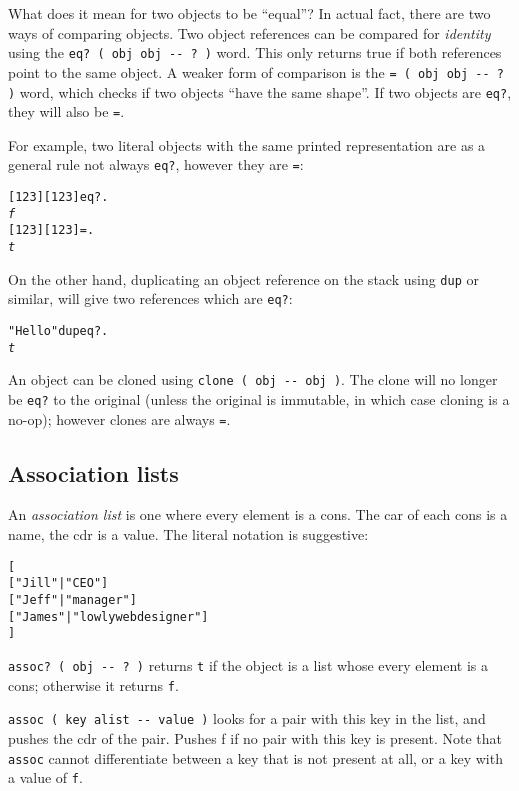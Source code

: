 \documentclass[english]{article}
\begin{document}
What does it mean for two objects to be ``equal''? In actual fact, there are two ways of comparing objects. Two object references can be compared for \emph{identity} using the \texttt{eq? ( obj obj -{}- ? )} word. This only returns true if both references point to the same object. A weaker form of comparison is the \texttt{= ( obj obj -{}- ? )} word, which checks if two objects ``have the same shape''.
If two objects are \texttt{eq?}, they will also be \texttt{=}.

For example, two literal objects with the same printed representation are as a general rule not always \texttt{eq?}, however they are \texttt{=}:

\begin{alltt}
{[} 1 2 3 {]} {[} 1 2 3 {]} eq? .
\emph{f}
{[} 1 2 3 {]} {[} 1 2 3 {]} = .
\emph{t}
\end{alltt}

On the other hand, duplicating an object reference on the stack using \texttt{dup} or similar, will give two references which are \texttt{eq?}:

\begin{alltt}
"Hello" dup eq? .
\emph{t}
\end{alltt}

An object can be cloned using \texttt{clone ( obj -{}- obj )}. The clone will no longer be \texttt{eq?} to the original (unless the original is immutable, in which case cloning is a no-op); however clones are always \texttt{=}.

\subsection{Association lists}

An \emph{association list} is one where every element is a cons. The
car of each cons is a name, the cdr is a value. The literal notation
is suggestive:

\begin{alltt}
{[}
    {[} "Jill"  | "CEO" {]}
    {[} "Jeff"  | "manager" {]}
    {[} "James" | "lowly web designer" {]}
{]}
\end{alltt}

\texttt{assoc? ( obj -{}- ? )} returns \texttt{t} if the object is
a list whose every element is a cons; otherwise it returns \texttt{f}.

\texttt{assoc ( key alist -{}- value )} looks for a pair with this
key in the list, and pushes the cdr of the pair. Pushes f if no pair
with this key is present. Note that \texttt{assoc} cannot differentiate between
a key that is not present at all, or a key with a value of \texttt{f}.
\end{document}
